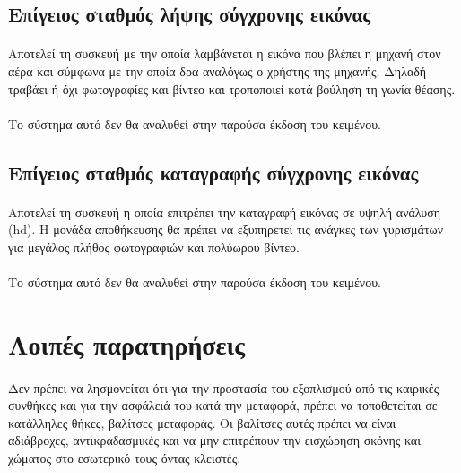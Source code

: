 \documentclass[a4paper, 12pt, twoside]{report}
\begin{document}
{{{{{{		\subsection{Επίγειος σταθμός λήψης σύγχρονης εικόνας}	
			\paragraph{}{Αποτελεί τη συσκευή με την οποία λαμβάνεται η εικόνα που βλέπει η μηχανή στον αέρα και σύμφωνα με την οποία δρα αναλόγως ο χρήστης της μηχανής. Δηλαδή τραβάει ή όχι φωτογραφίες και βίντεο και τροποποιεί κατά βούληση τη γωνία θέασης.
			}
			\paragraph{}{Το σύστημα αυτό δεν θα αναλυθεί στην παρούσα έκδοση του κειμένου.}
			
		\subsection{Επίγειος σταθμός καταγραφής σύγχρονης εικόνας}
			\paragraph{}{Αποτελεί τη συσκευή η οποία επιτρέπει την καταγραφή εικόνας σε υψηλή ανάλυση (hd). Η μονάδα αποθήκευσης θα πρέπει να εξυπηρετεί τις ανάγκες των γυρισμάτων για μεγάλος πλήθος φωτογραφιών και πολύωρου βίντεο.
			}
			\paragraph{}{Το σύστημα αυτό δεν θα αναλυθεί στην παρούσα έκδοση του κειμένου.}
			
		\section{Λοιπές παρατηρήσεις}
		
			\paragraph{}{Δεν πρέπει να λησμονείται ότι για την προστασία του εξοπλισμού από τις καιρικές συνθήκες και για την ασφάλειά του κατά την μεταφορά, πρέπει να τοποθετείται σε κατάλληλες θήκες, βαλίτσες μεταφοράς. Οι βαλίτσες αυτές πρέπει να είναι αδιάβροχες, αντικραδασμικές και να μην επιτρέπουν την εισχώρηση σκόνης και χώματος στο εσωτερικό τους όντας κλειστές.
			}
	
}}}}}}
\end{document}
